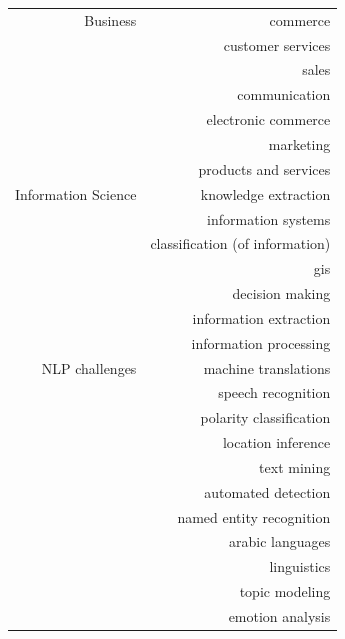 \begin{center}
\begin{longtable}{ rr }
        Business              & commerce                        \\
                              & customer services               \\
                              & sales                           \\
                              & communication                   \\
                              & electronic commerce             \\
                              & marketing                       \\
                              & products and services           \\
        \hline
        Information Science   & knowledge extraction            \\
                              & information systems             \\
                              & classification (of information) \\
                              & gis                             \\
                              & decision making                 \\
                              & information extraction          \\
                              & information processing          \\
        \hline
        NLP challenges        & machine translations            \\
                              & speech recognition              \\
                              & polarity classification         \\
                              & location inference              \\
                              & text mining                     \\
                              & automated detection             \\
                              & named entity recognition        \\
                              & arabic languages                \\
                              & linguistics                     \\
                              & topic modeling                  \\
                              & emotion analysis                \\

\end{longtable}
\end{center}
